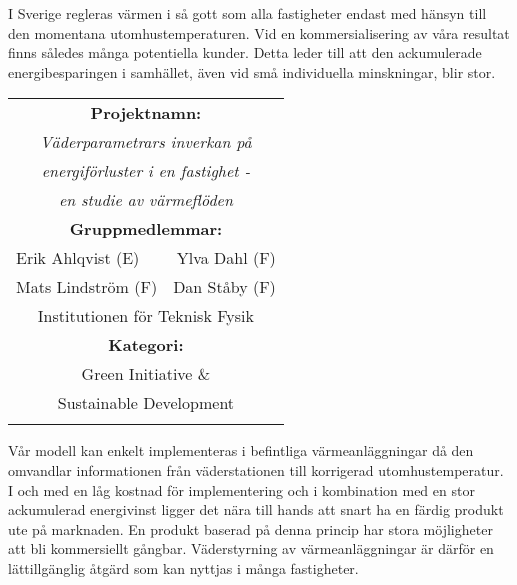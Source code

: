 \documentclass[11pt,a4paper]{article}
\begin{document}
\begin{multicols}{2}
I Sverige regleras värmen i så gott som alla fastigheter endast med hänsyn till den momentana utomhustemperaturen. Vid en kommersialisering av våra
resultat finns således många potentiella kunder. Detta leder till att den ackumulerade energibesparingen i samhället, även vid små individuella minskningar, blir stor.

\renewcommand{\arraystretch}{1.2}
\noindent
\resizebox{8cm}{!} {
\begin{tabular}{l r}
\hline
\multicolumn{2}{|c|}{\cellcolor{YellowGreen} \textbf{Projektnamn:}}\\[3pt]
\multicolumn{2}{|c|}{\cellcolor{YellowGreen} \textit{Väderparametrars inverkan på}}\\
\multicolumn{2}{|c|}{\cellcolor{YellowGreen} \textit{energiförluster i en fastighet -}}\\
\multicolumn{2}{|c|}{\cellcolor{YellowGreen} \textit{en studie av värmeflöden}}\\
\multicolumn{2}{|c|}{\cellcolor{YellowGreen} \textbf{Gruppmedlemmar:}} \\[3pt]
\multicolumn{1}{|l}{\cellcolor{YellowGreen} Erik Ahlqvist (E)} & \multicolumn{1}{r|}{\cellcolor{YellowGreen} Ylva Dahl (F)}\\
\multicolumn{1}{|l}{\cellcolor{YellowGreen} Mats Lindström (F)} & \multicolumn{1}{r|}{\cellcolor{YellowGreen} Dan Ståby (F)}\\
\multicolumn{2}{|c|}{\cellcolor{YellowGreen} Institutionen för Teknisk Fysik} \\
\multicolumn{2}{|c|}{\cellcolor{YellowGreen} \textbf{Kategori:}} \\[3pt]
\multicolumn{2}{|c|}{\cellcolor{YellowGreen} Green Initiative \&}\\
\multicolumn{2}{|c|}{\cellcolor{YellowGreen} Sustainable Development}\\
\hline
& \\
\end{tabular}
}

Vår modell kan enkelt implementeras i befintliga värmeanläggningar då den omvandlar informationen från väderstationen till korrigerad utomhustemperatur. I och med en låg kostnad för implementering och i kombination med en stor ackumulerad energivinst ligger det nära till hands att snart ha en färdig produkt ute på marknaden. 
En produkt baserad på denna princip har stora möjligheter att bli kommersiellt gångbar. Väderstyrning av värmeanläggningar är därför en lättillgänglig åtgärd som kan nyttjas i många fastigheter.


\end{multicols}
\end{document}
